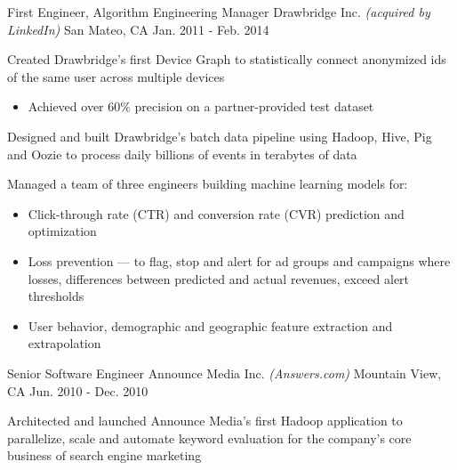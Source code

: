 \begin{cventries}
  \cventry
    {First Engineer, Algorithm Engineering Manager} %
    {Drawbridge Inc. \bodyfontlight\emph{(acquired by LinkedIn)}} %
    {San Mateo, CA} %
    {Jan. 2011 - Feb. 2014} %
    {
      \begin{cvitems} %
        \item{Created Drawbridge's first Device Graph to statistically connect anonymized ids of the same user across multiple devices}
          \begin{itemize}[label=$\circ$]
            \item{Achieved over 60\% precision on a partner-provided test dataset}
          \end{itemize}
        \item{Designed and built Drawbridge’s batch data pipeline using Hadoop, Hive, Pig and Oozie to process daily billions of events in terabytes of data}
        \item{Managed a team of three engineers building machine learning models for:}
          \begin{itemize}[label=$\circ$]
            \item{Click-through rate (CTR) and conversion rate (CVR) prediction and optimization}
            \item{Loss prevention --- to flag, stop and alert for ad groups and campaigns where losses, differences between predicted and actual revenues, exceed alert thresholds}
            \item{User behavior, demographic and geographic feature extraction and extrapolation}
          \end{itemize}
      \end{cvitems}
    }

  \cventry
    {Senior Software Engineer} %
    {Announce Media Inc. \bodyfontlight\emph{(Answers.com)}} %
    {Mountain View, CA} %
    {Jun. 2010 - Dec. 2010} %
    {
      \begin{cvitems} %
        \item{Architected and launched Announce Media’s first Hadoop application to parallelize, scale and automate keyword evaluation for the company's core business of search engine marketing}
      \end{cvitems}
    }


\end{cventries}
